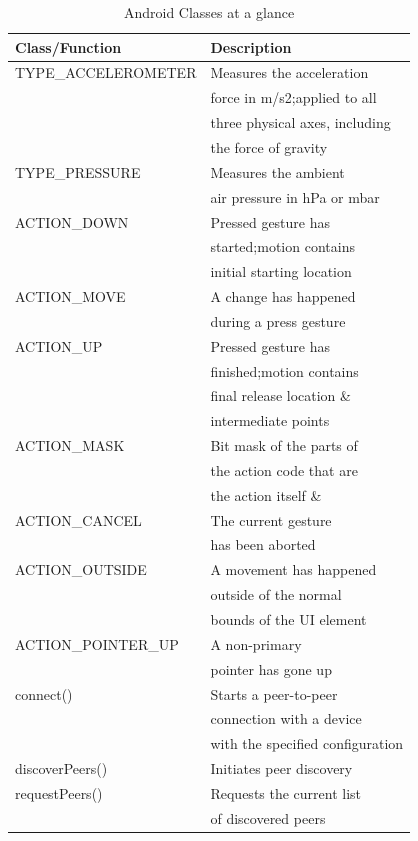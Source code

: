 \documentclass[10pt,conference,letterpaper]{IEEEtran}
\begin{document}
\begin{table}[!h]
\centering

    \caption{Android Classes at a glance}     %
    \label{tab:font-sizes}

    \begin{small}
    \begin{tabular}{|l|l|}
    \hline
    \cline{2-2}
    {\bfseries  Class/Function}         & {\bfseries Description}             \\
	\hline
    TYPE\_ACCELEROMETER	&	Measures the acceleration     \\
    &  force in m/s2;applied to all \\
    & three physical axes, including  \\
    & the force of gravity \\
    \hline
    TYPE\_PRESSURE	&	Measures the ambient 	     \\
    & air pressure in hPa or mbar  \\   
    \hline
    ACTION\_DOWN	&	 Pressed gesture has \\
    & started;motion contains \\
    & initial starting location \\
    \hline
    ACTION\_MOVE	&	 A change has happened  \\
    & during a press gesture \\
    \hline
    ACTION\_UP	&	 Pressed gesture has  \\
    & finished;motion contains  \\
    & final release location \&  \\
	& intermediate points \\
    \hline
    ACTION\_MASK	&	 Bit mask of the parts of  \\
    & the action code that are \\
    & the action itself \&  \\
    \hline
    ACTION\_CANCEL	&	The current gesture   \\
    & has been aborted \\
    \hline
    ACTION\_OUTSIDE	&	A movement has happened    \\
    & outside of the normal  \\
    & bounds of the UI element \\
    \hline
    ACTION\_POINTER\_UP	&	A non-primary   \\
    & pointer has gone up  \\
    \hline
    connect()	&	Starts a peer-to-peer    \\
    & connection with a device  \\
    & with the specified configuration \\
    \hline
    discoverPeers()	&	Initiates peer discovery     \\
    \hline
    requestPeers()	&	Requests the current list   \\
    & of discovered peers \\
    \hline
    \end{tabular}
    \end{small} 
\end{table}
\end{document}
